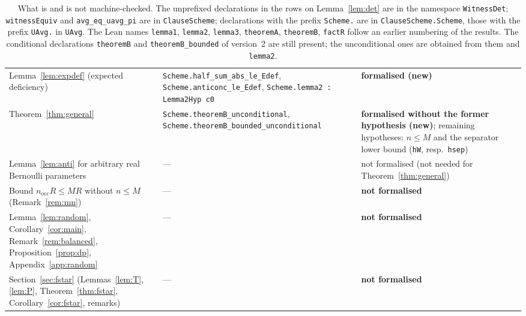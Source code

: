 \documentclass[11pt,a4paper]{article}
\theoremstyle{definition}
\theoremstyle{remark}
\newcommand{\nocc}{n_{\mathrm{occ}}}
\begin{document}
\begin{table}[tb]
\begin{tabular}{@{}>{\raggedright\arraybackslash}p{3.5cm}>{\raggedright\arraybackslash}p{6.0cm}>{\raggedright\arraybackslash}p{5.1cm}@{}}
Lemma~\ref{lem:expdef} (expected deficiency) & \texttt{Scheme.half\_sum\_abs\_le\_Edef}, \newline\texttt{Scheme.anticonc\_le\_Edef}, \newline\texttt{Scheme.lemma2 : Lemma2Hyp c0} & \textbf{formalised (new)}\\[2pt]
Theorem~\ref{thm:general} & \texttt{Scheme.\allowbreak theoremB\_unconditional}, \newline\texttt{Scheme.theoremB\_bounded\_}\newline\texttt{unconditional} & \textbf{formalised without the former hypothesis (new)}; remaining hypotheses: $n\le M$ and the separator lower bound (\texttt{hW}, resp.\ \texttt{hsep})\\
\midrule
Lemma~\ref{lem:anti} for arbitrary real Bernoulli parameters & --- & not formalised (not needed for Theorem~\ref{thm:general})\\[2pt]
Bound $\nocc R\le MR$ without $n\le M$ (Remark~\ref{rem:mn}) & --- & \textbf{not formalised}\\[2pt]
Lemma~\ref{lem:random}, Corollary~\ref{cor:main}, Remark~\ref{rem:balanced}, Proposition~\ref{prop:dp}, Appendix~\ref{app:random} & --- & \textbf{not formalised}\\[2pt]
Section~\ref{sec:fstar} (Lemmas~\ref{lem:T}, \ref{lem:P}, Theorem~\ref{thm:fstar}, Corollary~\ref{cor:fstar}, remarks) & --- & \textbf{not formalised}\\
\bottomrule
\end{tabular}
\caption{What is and is not machine-checked. The unprefixed declarations in the rows on
Lemma~\ref{lem:det} are in the namespace \texttt{WitnessDet}; \texttt{witnessEquiv} and
\texttt{avg\_eq\_uavg\_pi} are in \texttt{ClauseScheme}; declarations with the prefix
\texttt{Scheme.} are in \texttt{ClauseScheme.Scheme}, those with the prefix \texttt{UAvg.}
in \texttt{UAvg}. The
Lean names \texttt{lemma1}, \texttt{lemma2}, \texttt{lemma3}, \texttt{theoremA},
\texttt{theoremB}, \texttt{factR} follow an earlier numbering of the results. The
conditional declarations \texttt{theoremB} and \texttt{theoremB\_bounded} of version~2 are
still present; the unconditional ones are obtained from them and
\texttt{lemma2}.}\label{tab:lean}
\end{table}
\end{document}
